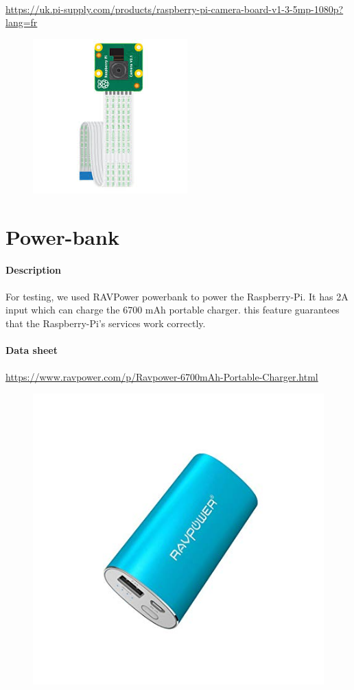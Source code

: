 \documentclass[12pt]{report}
\begin{document}
	\paragraph{}
	\url{https://uk.pi-supply.com/products/raspberry-pi-camera-board-v1-3-5mp-1080p?lang=fr}
	\begin{figure}[H]
		\begin{center}
			\includegraphics[scale=0.6]{res/camera.jpg}
		\end{center}
	\end{figure}
	\section{Power-bank}
	\textbf{Description}
	\paragraph{}
	For testing, we used RAVPower powerbank to power the Raspberry-Pi. It has 2A input which can charge the 6700 mAh portable charger. this feature guarantees that the Raspberry-Pi's services work correctly. \\ \\
	\textbf{Data sheet} 
	\paragraph{}
	\url{https://www.ravpower.com/p/Ravpower-6700mAh-Portable-Charger.html}
	\begin{figure}[H]
		\begin{center}
			\includegraphics[scale=0.6]{res/power.jpg}
		\end{center}
	\end{figure}
\end{document}
